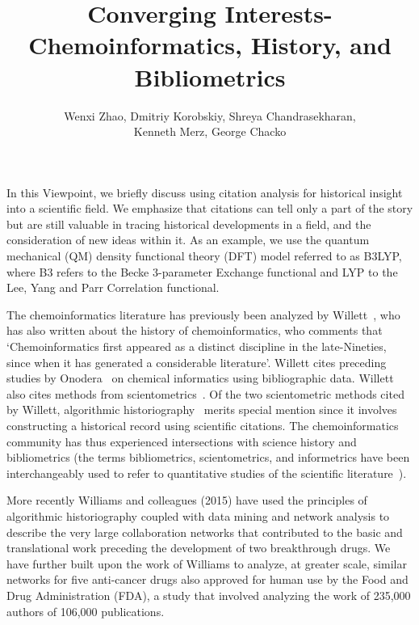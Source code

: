 \documentclass[11pt, oneside]{article}   	%
\title{Converging Interests- Chemoinformatics, History, and Bibliometrics}
\author{Wenxi Zhao, Dmitriy Korobskiy, Shreya Chandrasekharan, \\Kenneth Merz, George Chacko}
\begin{document}
\maketitle

In this Viewpoint, we briefly discuss using citation analysis for historical insight into a scientific field. We emphasize that citations can tell only a part of the story but are still valuable in tracing historical developments in a field, and the consideration of new ideas within it.  As an example, we use the quantum mechanical (QM) density functional theory (DFT) model referred to as B3LYP, where B3 refers to the Becke 3-parameter Exchange functional and LYP to the Lee, Yang and Parr Correlation functional.

 The chemoinformatics literature has previously been analyzed by Willett~\citep{willett2008}, who has also written about the history of chemoinformatics\citep{willett2003}, who comments that  `Chemoinformatics first appeared as a distinct discipline in the late-Nineties, since when it has generated a considerable literature'. Willett cites preceding studies by Onodera~\citep{onodera2001,onodera2003} on chemical informatics using bibliographic data. Willett also cites methods from scientometrics~\citep{garfield2004,leydesdorff2007}.  Of the two scientometric methods cited by Willett, algorithmic historiography~\citep{garfield2004} merits special mention since it involves constructing a historical record using scientific citations. The chemoinformatics community has thus experienced intersections with science history and bibliometrics (the terms bibliometrics, scientometrics, and informetrics have been interchangeably used to refer to quantitative studies of the scientific literature~\citep{debellis2009}).
 
More recently Williams and colleagues (2015)\citep{williams2015scientific} have used the principles of algorithmic historiography coupled with data mining and network analysis to describe the very large collaboration networks that contributed to the basic and translational work preceding the development of two breakthrough drugs. We\citep{keserci2017research} have further built upon the work of Williams to analyze, at greater scale, similar networks for five anti-cancer drugs also approved for human use by the Food and Drug Administration (FDA), a study that involved analyzing the work of 235,000 authors of 106,000 publications.
\end{document}
